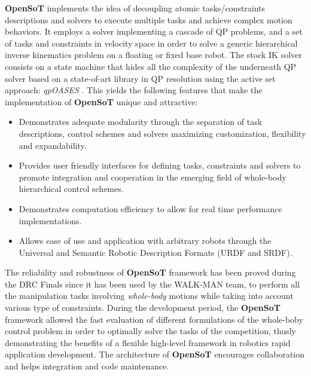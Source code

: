 \textbf{OpenSoT} implements the idea of decoupling atomic tasks/constraints descriptions and solvers to execute multiple tasks and achieve complex motion behaviors. It employs a solver implementing a cascade of QP problems, and a set of tasks and constraints in velocity space in order to solve a generic hierarchical inverse kinematics problem on a floating or fixed base robot. The stock IK solver consists on a state machine that hides all the complexity of the underneath QP solver based on a state-of-art library in QP resolution using the active set approach: \emph{qpOASES} \cite{ferreau2013}.
This yields the following features that make the implementation of \textbf{OpenSoT} unique and attractive:   
\begin{itemize}
\item Demonstrates adequate modularity through the separation of task descriptions, control schemes and solvers maximizing customization, flexibility and expandability.  
\item Provides user friendly interfaces for defining tasks, constraints and solvers to promote integration and cooperation in the emerging field of whole-body hierarchical control schemes.
\item Demonstrates computation efficiency to allow for real time performance implementations.
\item Allows ease of use and application with arbitrary robots through the Universal and Semantic Robotic Description Formats (URDF and SRDF).
\end{itemize}
The reliability and robustness of \textbf{OpenSoT} framework has been proved during the DRC Finals since it has been used by the WALK-MAN team, to perform all the manipulation tasks involving \emph{whole-body} motions while taking into account various type of constraints. During the development period, the \textbf{OpenSoT} framework allowed the fast evaluation of different formulations of the whole-boby control problem in order to optimally solve the tasks of the competition, thusly demonstrating the benefits of a flexible high-level framework in robotics rapid application development. 
The architecture of \textbf{OpenSoT} encourages collaboration and helps integration and code maintenance.

